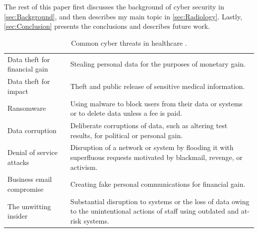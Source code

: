 \documentclass[pdf,bookmarks,colorlinks=true]{IEEEtran}
\begin{document}
The rest of this paper first discusses the background of cyber security in
\ref{sec:Background}, and then describes my main topic in
\ref{sec:Radiology}. Lastly, \ref{sec:Conclusion} presents the
conclusions and describes future work.

\begin{table}[tbh]
	\caption{Common cyber threats in healthcare \cite{martin2017cybersecurity}.}
	\centering
	\begin{tabular}{l | l}
		\hline
	Data theft for financial gain & Stealing personal data for the purposes of monetary gain. \\
	Data theft for impact & Theft and public release of sensitive medical information. \\
	Ransomware & Using malware to block users from their data or systems or to delete data unless a fee is paid. \\
	Data corruption & Deliberate corruptions of data, such as altering test results, for political or personal gain. \\
	Denial of service attacks & Disruption of a network or system by flooding it with superfluous requests motivated by blackmail, revenge, or activism. \\
	Business email compromise & Creating fake personal communications for financial gain.\\ 
	The unwitting insider & Substantial disruption to systems or the loss of data owing to the unintentional actions of staff using outdated and at-risk systems. \\
	\hline
	\end{tabular}
	\label{tab:common}
\end{table}
\end{document}
